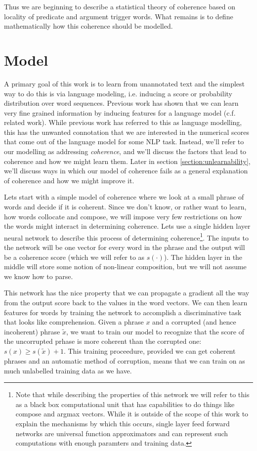 \documentclass[11pt,letterpaper]{article}
\begin{document}
Thus we are beginning to describe a statistical theory of coherence
based on locality of predicate and argument trigger words.
What remains is to define mathematically how this coherence should be modelled.


\section{Model} %
A primary goal of this work is to learn from unannotated text and
the simplest way to do this is via language modeling, i.e. inducing
a score or probability distribution over word sequences.
Previous work has shown that we can learn very fine grained information
by inducing features for a language model (c.f. related work).
While previous work has referred to this as language modelling,
this has the unwanted connotation that we are interested in the
numerical scores that come out of the language model for some NLP task.
Instead, we'll refer to our modelling as addressing {\em coherence},
and we'll discuss the factors that lead to coherence and how we might learn them. 
Later in section \ref{section:unlearnability}, we'll discuss ways in which our model of coherence
fails as a general explanation of coherence and how we might improve it.

Lets start with a simple model of coherence where we look at a small phrase of words
and decide if it is coherent. Since we don't know, or rather want to learn, how words
collocate and compose, we will impose very few restrictions on how the words might
interact in determining coherence. Lets use a single hidden layer neural network to
describe this process of determining coherence\footnote{Note that while describing
the properties of this network we will refer to this as a black box computational
unit that has capabilities to do things like compose and argmax vectors.
While it is outside of the scope of this work to explain the mechanisms by which this
occurs, single layer feed forward networks are universal function approximators \cite{Hornik:1989}
and can represent such computations with enough paramters and training data.
}.
The inputs to the network will be one
vector for every word in the phrase and the output will be a coherence score
(which we will refer to as $s(\cdot)$).
The hidden layer in the middle will store some notion of non-linear composition,
but we will not assume we know how to parse.

This network has the nice property that we can propagate a gradient all the
way from the output score back to the values in the word vectors.
We can then learn features for words by training the network to accomplish
a discriminative task that looks like comprehension.
Given a phrase $x$ and a corrupted (and hence incoherent) phrase $\tilde{x}$,
we want to train our model to recognize that the score of the uncorrupted prhase
is more coherent than the corrupted one: $s(x) \ge s(\tilde{x}) + 1$.
This training proceedure, provided we can get coherent phrases and an automatic method of
corruption, means that we can train on as much unlabelled training data as we have.
\end{document}
